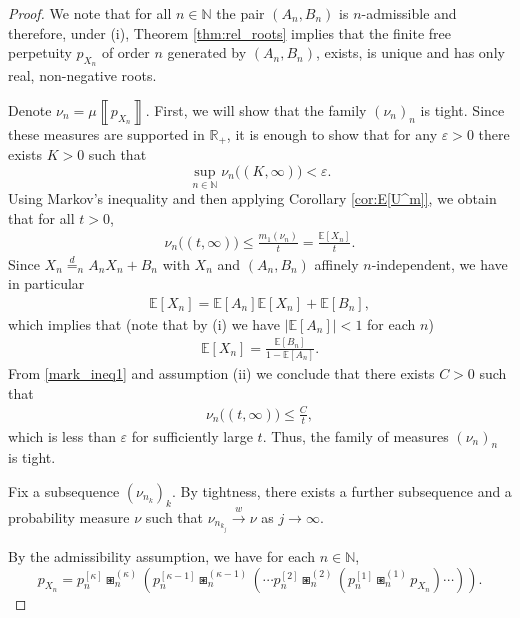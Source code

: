 \documentclass[a4paper,11pt]{amsart}
\numberwithin{equation}{section}
\newcommand{\weak}{\xrightarrow{w}}
\newcommand{\N}{\mathbb{N}}
\newcommand{\E}{\mathbb{E}}
\newcommand{\R}{\mathbb{R}}
\newcommand{\meas}[1]{\mu\! \left\llbracket #1 \right\rrbracket}
\begin{document}
\begin{proof}
We note that for all $n\in\N$ the pair $({A_n}, {B_n})$ is $n$-admissible and therefore, under (i), Theorem \ref{thm:rel_roots} implies that the finite free perpetuity $p_{X_n}$ of order $n$ generated by $(A_n,B_n)$, exists, is unique and has only real, non-negative roots. 

Denote $\nu_n = \meas{p_{X_n}}$.
First, we will show that the family $(\nu_n )_n$ is tight. Since these measures are supported in $\R_+$, it is enough to show that for any $\varepsilon>0$ there exists $K>0$ such that  
\[
\sup_{n\in\N}\nu_n\big((K, \infty)\big)<\varepsilon.
\]
Using Markov's inequality and then applying Corollary \ref{cor:E[U^m]}, we obtain that for all $t>0$,
    \begin{align}\label{mark_ineq1}
\nu_n \big((t, \infty)\big)\leq \frac{m_1(\nu_n)}{t} = \frac{\E[X_n]}{t}.
    \end{align}
   Since $X_n \stackrel{d}{=}_{n} A_n X_n+B_n$ with $X_n$ and $(A_n,B_n)$ affinely $n$-independent, we have in particular 
    \begin{align*}
\E[{X_n}]=\E[{A_n}]\E[{X_n}]+\E[{B_n}],
    \end{align*}
    which implies that (note that by (i) we have $|\E[A_n]|<1$ for each $n$)
    \begin{align*}
        \E[{X_n}]=\frac{\E[{B_n}]}{1-\E[{A_n}]}. 
    \end{align*}
    From \eqref{mark_ineq1} and assumption (ii) we conclude that there exists $C>0$ such that 
    \begin{align*}
     \nu_n \big((t, \infty)\big)\leq \frac{C}{t},
    \end{align*}
    which is less than $\varepsilon$ for sufficiently large $t$. 
  Thus, the family of measures $(\nu_n )_n$ is tight. 

 Fix a subsequence $(\nu_{n_{k}})_k$. By tightness, there exists a further subsequence and a probability measure $\nu$ such that $\nu_{n_{k_j}}\weak \nu$ as $j\to\infty$. 
      

By the admissibility assumption, we have for each $n\in\N$, 
    \[
p_{X_n} =  p_{n}^{[\kappa]}\boxast_n^{(\kappa)} \left( p_{n}^{[\kappa-1]}\boxast_n^{(\kappa-1)}\left(\cdots p_n^{[2]}\boxast_n^{(2)}\left( p_{n}^{[1]}\boxast_n^{(1)} p_{X_n}\right)\cdots \right)\right).
    \]
    

\end{proof}
\end{document}
